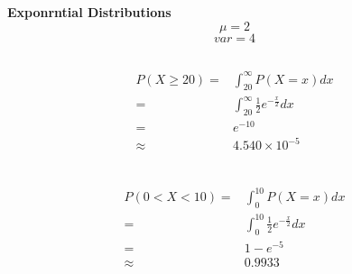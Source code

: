 \documentclass{article}
\begin{document}
    \section{}
        \subsection{}
            \paragraph{
                Exponrntial Distributions
                $$\mu={2}$$
                $$var={4}$$
            }
        \subsection{}
            \paragraph{
                \begin{equation*}
                    \begin{split}
                        P(X\geq 20)=&\int_{20}^\infty P(X=x)dx\\
                            =&\int_{20}^\infty \frac{1}{2}e^{-\frac{x}{2}}dx\\
                            =&e^{-10}\\
                            \approx&4.540\times 10^{-5}\\
                    \end{split}
                \end{equation*}
            }
        \subsection{}
            \paragraph{
                \begin{equation*}
                    \begin{split}
                        P(0<X<10)=&\int_{0}^{10}P(X=x)dx\\
                            =&\int_0^{10}\frac{1}{2}e^{-\frac{x}{2}}dx\\
                            =&1-e^{-5}\\
                            \approx&0.9933\\
                    \end{split}
                \end{equation*}
            }
\end{document}
